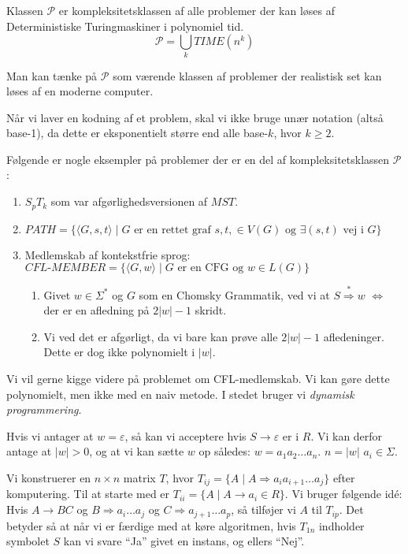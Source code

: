 \begin{definition}
	Klassen $\mathcal{P}$ er kompleksitetsklassen af alle problemer der kan løses af Deterministiske Turingmaskiner i polynomiel tid.
	\begin{equation}
		\mathcal{P} = \bigcup_k TIME(n^{k})
	\end{equation}
\end{definition}

Man kan tænke på $\mathcal{P}$ som værende klassen af problemer der realistisk set kan løses af en moderne computer.

Når vi laver en kodning af et problem, skal vi ikke bruge unær notation (altså base-1), da dette er eksponentielt større end alle base-$k$, hvor $k \ge 2$.


Følgende er nogle eksempler på problemer der er en del af kompleksitetsklassen $\mathcal{P}$:
\begin{enumerate}
	\item $S_{p}T_{k}$ som var afgørlighedsversionen af $MST$.
	\item $PATH = \{\langle G , s, t \rangle \mid G \text{ er en rettet graf } s, t, \in V(G) \text{ og } \exists (s,t) \text{ vej i } G\}$
	\item Medlemskab af kontekstfrie sprog: $CFL\text{-}MEMBER = \{\langle G , w \rangle \mid G \text{ er en CFG og } w \in L(G)\}$
	      \begin{enumerate}
		      \item Givet $w \in \Sigma^{*}$ og $G$ som en Chomsky Grammatik, ved vi at $S \stackrel{*}{\Rightarrow} w$ $\iff$ der er en afledning på $2|w| - 1$ skridt.
		      \item Vi ved det er afgørligt, da vi bare kan prøve alle $2|w|-1$ afledeninger. Dette er dog ikke polynomielt i $|w|$.
	      \end{enumerate}
\end{enumerate}

Vi vil gerne kigge videre på problemet om CFL-medlemskab. Vi kan gøre dette polynomielt, men ikke med en naiv metode. I stedet bruger vi \textit{dynamisk programmering}.

Hvis vi antager at $w = \varepsilon$, så kan vi acceptere hvis $S \rightarrow \varepsilon$ er i $R$. Vi kan derfor antage at $|w| > 0$, og at vi kan sætte $w$ op således: $w = a_{1}a_{2} \ldots a_{n}$. $n = |w|$ $a_{i} \in \Sigma$.

Vi konstruerer en $n \times n $ matrix $T$, hvor $T_{ij} = \{A \mid A \Rightarrow a_{i}a_{i+1} \ldots a_{j}\}$ efter komputering. Til at starte med er $T_{ii} = \{A \mid A \rightarrow a_{i} \in R\}$. Vi bruger følgende idé: Hvis $A \rightarrow BC$ og $B \Rightarrow a_{i} \ldots a_{j}$ og $C \Rightarrow a_{j+1} \ldots a_{p}$, så tilføjer vi $A$ til $T_{ip}$. Det betyder så at når vi er færdige med at køre algoritmen, hvis $T_{1n}$  indholder symbolet $S$ kan vi svare ``Ja'' givet en instans, og ellers ``Nej''.


